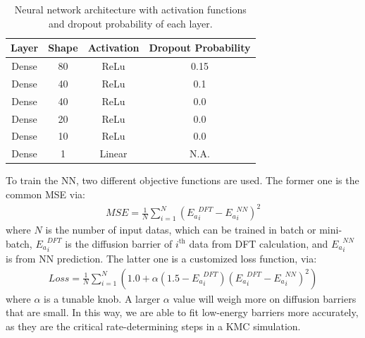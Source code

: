 \begin{table}[!htbp]
\centering
\caption[Neural network architecture with activation functions and dropout probability of each layer.]{Neural network architecture with activation functions and dropout probability of each layer.}
\label{Chap:Al/Vac:tab:NN}
\begin{tabular}{cccc}
\\
\hline
\hline
Layer & Shape & Activation & Dropout Probability \\ 
\hline
Dense & 80    & ReLu       & 0.15                \\
Dense & 40    & ReLu       & 0.1                 \\
Dense & 40    & ReLu       & 0.0                 \\
Dense & 20    & ReLu       & 0.0                 \\
Dense & 10    & ReLu       & 0.0                 \\
Dense & 1     & Linear     & N.A.                \\ 
\hline
\hline
\end{tabular}
\end{table}


To train the \ac{NN}, two different objective functions are used. The former one is the common \acf{MSE} via:
\begin{subequations}
\begin{align}
MSE = \frac{1}{N}\sum_{i=1}^{N}({E_a}_{i}^{DFT} - {E_a}_{i}^{NN})^2
\label{Chap:Al/Vac:eq:MSE}
\end{align}
\end{subequations}
where $N$ is the number of input datas, which can be trained in batch or mini-batch, ${E_a}_i^{DFT}$ is the diffusion barrier of $i^{\text{th}}$ data from \ac{DFT} calculation, and ${E_a}_{i}^{NN}$ is from \ac{NN} prediction. The latter one is a customized loss function, via:
\begin{subequations}
\begin{align}
Loss = \frac{1}{N}\sum_{i=1}^{N}{(1.0 + \alpha (1.5 - {E_a}_{i}^{DFT})({E_a}_{i}^{DFT} - {E_a}_{i}^{NN})^2)}
\label{Chap:Al/Vac:eq:custLoss}
\end{align}
\end{subequations}
where $\alpha$ is a tunable knob. A larger $\alpha$ value will weigh more on diffusion barriers that are small. In this way, we are able to fit low-energy barriers more accurately, as they are the critical rate-determining steps in a \ac{KMC} simulation.


